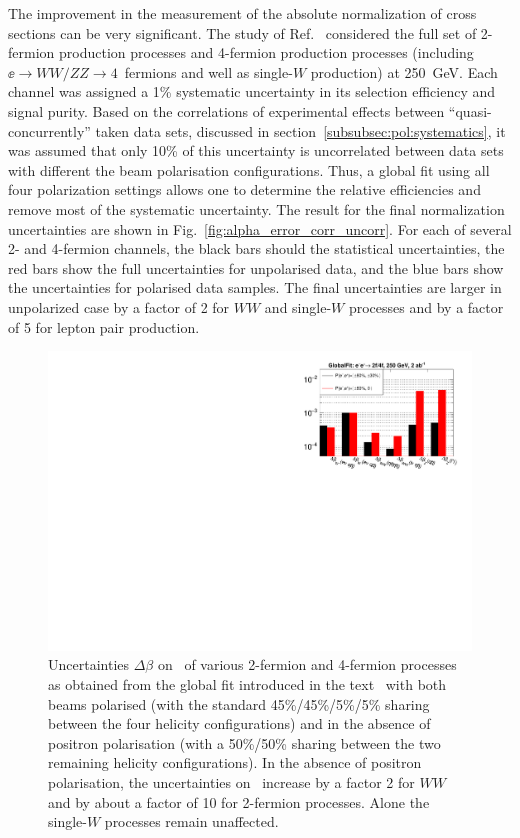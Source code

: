 The improvement in the measurement of the absolute normalization of cross sections can be very significant.  The study of Ref.~\cite{bib:PhDRobert} considered the full set of 2-fermion production processes and 4-fermion production processes (including $\ee\to WW / ZZ \to 4$~fermions and well as single-$W$ production) at 250~GeV.   Each channel was assigned a 1\% systematic uncertainty in its selection efficiency and signal purity. Based on the correlations of experimental effects between ``quasi-concurrently'' taken data sets, discussed in section~\ref{subsubsec:pol:systematics}, it was assumed that only 10\% of this uncertainty is uncorrelated between data sets with different the beam polarisation configurations. Thus, a global fit using all four
polarization settings allows one to determine the relative efficiencies and remove most of the systematic uncertainty.  The result for the final normalization uncertainties are shown in 
Fig.~\ref{fig:alpha_error_corr_uncorr}.  For each of several 2- and 4-fermion channels, the black bars should the statistical uncertainties, the red bars show the full uncertainties for unpolarised data, and the blue bars show the uncertainties for polarised data samples.   The final uncertainties are larger in unpolarized case by a factor of 2 for $WW$ and single-$W$ processes and by a factor of 5 for lepton pair production.

\begin{figure}
\centering
\includegraphics[width=0.95\linewidth]{./chapters/figures/beta_precision_upolarized.pdf}
		
\caption{Uncertainties $\Delta \beta$ on \ALR\ of various 2-fermion and 4-fermion processes as obtained from the global fit introduced in the text~\cite{bib:PhDRobert} with both beams polarised (with the standard 45\%/45\%/5\%/5\% sharing between the four helicity configurations) and in the absence of positron polarisation (with a 50\%/50\% sharing between the two remaining helicity configurations). In the absence of positron polarisation, the  uncertainties on \ALR\ increase by a factor 2 for $WW$ and by about a factor of 10 for 2-fermion processes. Alone the single-$W$ processes remain unaffected.}
\label{fig:beta_error_noposipol}
\end{figure}


